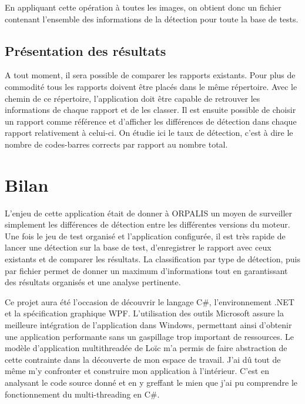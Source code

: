 En appliquant cette opération à toutes les images, on obtient donc un fichier contenant l'ensemble des informations de la détection pour toute la base de tests.

\subsection{Présentation des résultats}

A tout moment, il sera possible de comparer les rapports existants. Pour plus de commodité tous les rapports doivent être placés dans le même répertoire. Avec le chemin de ce répertoire, l'application doit être capable de retrouver les informations de chaque rapport et de les classer. Il est ensuite possible de choisir un rapport comme référence et d'afficher les différences de détection dans chaque rapport relativement à celui-ci. On étudie ici le taux de détection, c'est à dire le nombre de codes-barres corrects par rapport au nombre total.


\section{Bilan}

L'enjeu de cette application était de donner à ORPALIS un moyen de surveiller simplement les différences de détection entre les différentes versions du moteur. Une fois le jeu de test organisé et l'application configurée, il est très rapide de lancer une détection sur la base de test, d'enregistrer le rapport avec ceux existants et de comparer les résultats. La classification par type de détection, puis par fichier permet de donner un maximum d'informations tout en garantissant des résultats organisés et une analyse pertinente.

Ce projet aura été l'occasion de découvrir le langage C\#, l'environnement .NET et la spécification graphique WPF. L'utilisation des outils Microsoft assure la meilleure intégration de l'application dans Windows, permettant ainsi d'obtenir une application performante sans un gaspillage trop important de ressources. Le modèle d'application multithreadée de Loïc m'a permis de faire abstraction de cette contrainte dans la découverte de mon espace de travail. J'ai dû tout de même m'y confronter et construire mon application à l'intérieur. C'est en analysant le code source donné et en y greffant le mien que j'ai pu comprendre le fonctionnement du multi-threading en C\#.